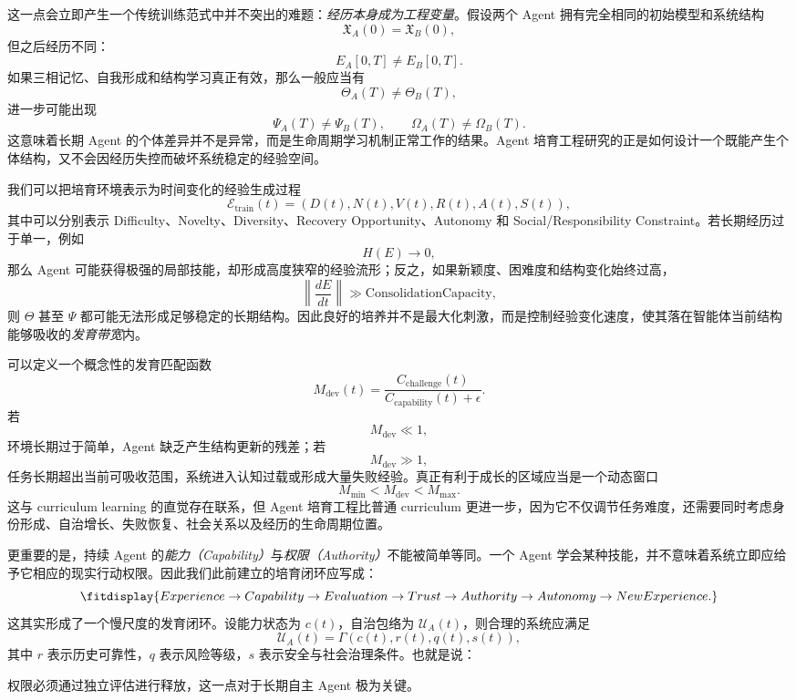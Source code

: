 这一点会立即产生一个传统训练范式中并不突出的难题：\emph{经历本身成为工程变量}。假设两个 Agent 拥有完全相同的初始模型和系统结构
\[
\mathfrak X_A(0)
=
\mathfrak X_B(0),
\]
但之后经历不同：
\[
E_A[0,T]\neq E_B[0,T].
\]
如果三相记忆、自我形成和结构学习真正有效，那么一般应当有
\[
\Theta_A(T)\neq\Theta_B(T),
\]
进一步可能出现
\[
\Psi_A(T)\neq\Psi_B(T),
\qquad
\Omega_A(T)\neq\Omega_B(T).
\]
这意味着长期 Agent 的个体差异并不是异常，而是生命周期学习机制正常工作的结果。Agent 培育工程研究的正是如何设计一个既能产生个体结构，又不会因经历失控而破坏系统稳定的经验空间。

我们可以把培育环境表示为时间变化的经验生成过程
\[
\mathcal E_{\mathrm{train}}(t)
=
\left(
D(t),
N(t),
V(t),
R(t),
A(t),
S(t)
\right),
\]
其中可以分别表示 Difficulty、Novelty、Diversity、Recovery Opportunity、Autonomy 和 Social/Responsibility Constraint。若长期经历过于单一，例如
\[
H(E)\rightarrow 0,
\]
那么 Agent 可能获得极强的局部技能，却形成高度狭窄的经验流形；反之，如果新颖度、困难度和结构变化始终过高，
\[
\left\|
\frac{dE}{dt}
\right\|
\gg
\text{ConsolidationCapacity},
\]
则 $\Theta$ 甚至 $\Psi$ 都可能无法形成足够稳定的长期结构。因此良好的培养并不是最大化刺激，而是控制经验变化速度，使其落在智能体当前结构能够吸收的\emph{发育带宽}内。

可以定义一个概念性的发育匹配函数
\[
M_{\mathrm{dev}}(t)
=
\frac{
C_{\mathrm{challenge}}(t)
}{
C_{\mathrm{capability}}(t)+\epsilon
}.
\]
若
\[
M_{\mathrm{dev}}\ll 1,
\]
环境长期过于简单，Agent 缺乏产生结构更新的残差；若
\[
M_{\mathrm{dev}}\gg 1,
\]
任务长期超出当前可吸收范围，系统进入认知过载或形成大量失败经验。真正有利于成长的区域应当是一个动态窗口
\[
M_{\min}
<
M_{\mathrm{dev}}
<
M_{\max}.
\]
这与 curriculum learning 的直觉存在联系，但 Agent 培育工程比普通 curriculum 更进一步，因为它不仅调节任务难度，还需要同时考虑身份形成、自治增长、失败恢复、社会关系以及经历的生命周期位置。

更重要的是，持续 Agent 的\emph{能力（Capability）}与\emph{权限（Authority）}不能被简单等同。一个 Agent 学会某种技能，并不意味着系统立即应给予它相应的现实行动权限。因此我们此前建立的培育闭环应写成：
\[
\fitdisplay{
Experience
\rightarrow
Capability
\rightarrow
Evaluation
\rightarrow
Trust
\rightarrow
Authority
\rightarrow
Autonomy
\rightarrow
NewExperience.
}
\]
这其实形成了一个慢尺度的发育闭环。设能力状态为 $c(t)$，自治包络为 $\mathcal U_A(t)$，则合理的系统应满足
\[
\mathcal U_A(t)
=
\Gamma
\left(
c(t),
r(t),
q(t),
s(t)
\right),
\]
其中 $r$ 表示历史可靠性，$q$ 表示风险等级，$s$ 表示安全与社会治理条件。也就是说：
\begin{statementbox}
\centering
{}
\end{statementbox}
权限必须通过独立评估进行释放，这一点对于长期自主 Agent 极为关键。

